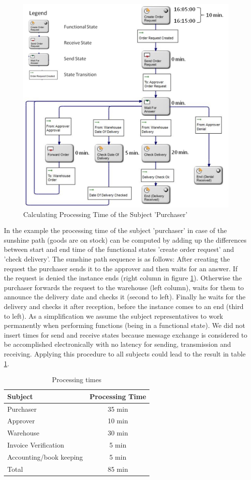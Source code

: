 \begin{figure}[htbp]
	\centering
	\includegraphics[width=0.6\linewidth] {Figures/Chapter5/ActivityBased/CalcPro.jpg}
	\caption[Calculating Processing Time of the Subject 'Purchaser']{Calculating Processing Time of the Subject 'Purchaser'}
	\label{fig:CalcPro}
\end{figure}


In the example the processing time of the subject 'purchaser' in case of the sunshine path (goods are on stock) can be computed by adding up the differences between start and end time of the functional states 'create order request' and 'check delivery'. The sunshine path sequence is as follows: After creating the request the purchaser sends it to the approver and then waits for an answer. If the request is denied the instance ends (right column in figure \ref{fig:CalcPro}). Otherwise the purchaser forwards the request to the warehouse (left column), waits for them to announce the delivery date and checks it (second to left). Finally he waits for the delivery and checks it after reception, before the instance comes to an end (third to left). As a simplification we assume the subject representatives to work permanently when performing functions (being in a functional state). We did not insert times for send and receive states because message exchange is considered to be accomplished electronically with no latency for sending, transmission and receiving. Applying this procedure to all subjects could lead to the result in table \ref{tab:procTime}.

\begin{table}[htbp]
	\centering
\begin{tabular}{|p{5.0 cm } |c|}
\hline
	\textbf{Subject} & Processing Time \\
	\hline
	\hline
	Purchaser & 35 min\\
	\hline
	Approver & 10 min \\
	\hline
	Warehouse & 30 min \\
	\hline
	Invoice Verification & 5 min \\
	\hline
	Accounting/book keeping & 5 min \\
	\hline
	Total & 85 min \\
	\hline
\end{tabular}
\caption{Processing times}
\label{tab:procTime}
\end{table}

